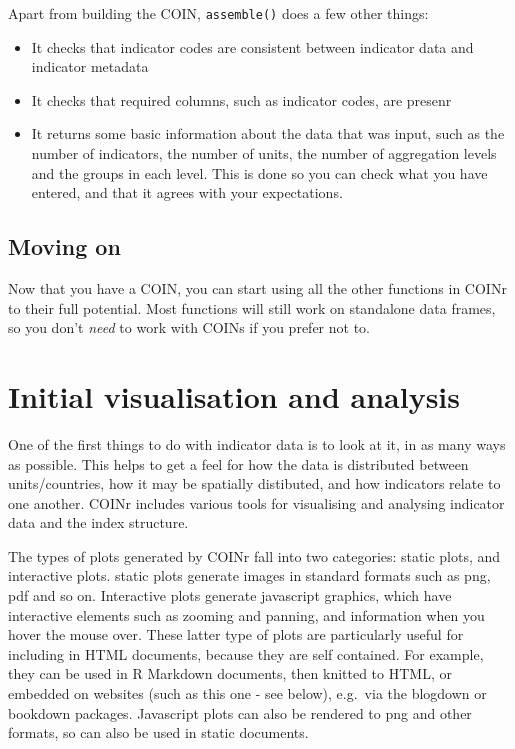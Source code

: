 \documentclass[
]{book}
\providecommand{\tightlist}{%
  \setlength{\itemsep}{0pt}\setlength{\parskip}{0pt}}
\begin{document}
Apart from building the COIN, \texttt{assemble()} does a few other things:

\begin{itemize}
\tightlist
\item
  It checks that indicator codes are consistent between indicator data and indicator metadata
\item
  It checks that required columns, such as indicator codes, are presenr
\item
  It returns some basic information about the data that was input, such as the number of indicators, the number of units, the number of aggregation levels and the groups in each level. This is done so you can check what you have entered, and that it agrees with your expectations.
\end{itemize}

\hypertarget{moving-on}{%
\section{Moving on}\label{moving-on}}

Now that you have a COIN, you can start using all the other functions in COINr to their full potential. Most functions will still work on standalone data frames, so you don't \emph{need} to work with COINs if you prefer not to.

\hypertarget{initial-visualisation-and-analysis}{%
\chapter{Initial visualisation and analysis}\label{initial-visualisation-and-analysis}}

One of the first things to do with indicator data is to look at it, in as many ways as possible. This helps to get a feel for how the data is distributed between units/countries, how it may be spatially distibuted, and how indicators relate to one another. COINr includes various tools for visualising and analysing indicator data and the index structure.

The types of plots generated by COINr fall into two categories: static plots, and interactive plots. static plots generate images in standard formats such as png, pdf and so on. Interactive plots generate javascript graphics, which have interactive elements such as zooming and panning, and information when you hover the mouse over. These latter type of plots are particularly useful for including in HTML documents, because they are self contained. For example, they can be used in R Markdown documents, then knitted to HTML, or embedded on websites (such as this one - see below), e.g.~via the blogdown or bookdown packages. Javascript plots can also be rendered to png and other formats, so can also be used in static documents.
\end{document}
